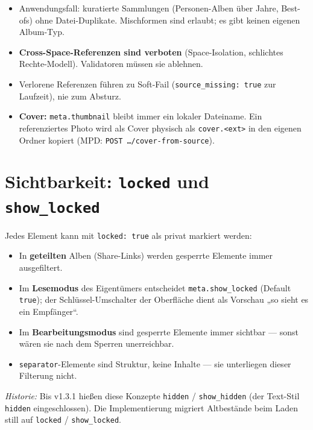 \documentclass[11pt,a4paper]{article}
\let\mpdtt\texttt
\renewcommand{\texttt}[1]{\mpdtt{\textcolor{mpdred}{#1}}}
\begin{document}
\begin{itemize}
  \item Anwendungsfall: kuratierte Sammlungen (Personen-Alben über Jahre,
        Best-ofs) ohne Datei-Duplikate. Mischformen sind erlaubt; es gibt
        keinen eigenen Album-Typ.
  \item \textbf{Cross-Space-Referenzen sind verboten} (Space-Isolation,
        schlichtes Rechte-Modell). Validatoren müssen sie ablehnen.
  \item Verlorene Referenzen führen zu Soft-Fail
        (\texttt{source\_missing: true} zur Laufzeit), nie zum Absturz.
  \item \textbf{Cover:} \texttt{meta.thumbnail} bleibt immer ein lokaler
        Dateiname. Ein referenziertes Photo wird als Cover physisch als
        \texttt{cover.<ext>} in den eigenen Ordner kopiert
        (MPD: \texttt{POST \dots/cover-from-source}).
\end{itemize}

\section{Sichtbarkeit: \texttt{locked} und \texttt{show\_locked}}\label{sec:locked}

Jedes Element kann mit \texttt{locked: true} als privat markiert werden:

\begin{itemize}
  \item In \textbf{geteilten} Alben (Share-Links) werden gesperrte
        Elemente immer ausgefiltert.
  \item Im \textbf{Lesemodus} des Eigentümers entscheidet
        \texttt{meta.show\_locked} (Default \texttt{true}); der
        Schlüssel-Umschalter der Oberfläche dient als Vorschau
        „so sieht es ein Empfänger“.
  \item Im \textbf{Bearbeitungsmodus} sind gesperrte Elemente immer
        sichtbar — sonst wären sie nach dem Sperren unerreichbar.
  \item \texttt{separator}-Elemente sind Struktur, keine Inhalte —
        sie unterliegen dieser Filterung nicht.
\end{itemize}

\emph{Historie:} Bis v1.3.1 hießen diese Konzepte \texttt{hidden} /
\texttt{show\_hidden} (der Text-Stil \texttt{hidden} eingeschlossen).
Die Implementierung migriert Altbestände beim Laden still auf
\texttt{locked} / \texttt{show\_locked}.
\end{document}
